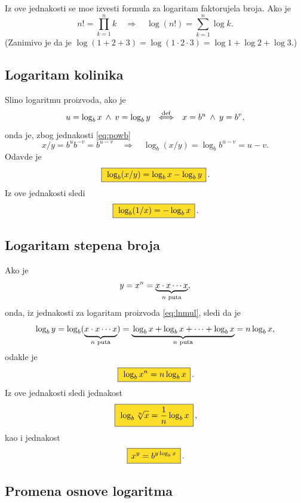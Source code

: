 \documentclass[12pt, twoside, a4paper]{article}
\def\land{\mathbin{\>\wedge\>}}
\def\logb{\log_b}
\def\okvir#1{\,\fcolorbox{black}{Goldenrod}{$\,\displaystyle{\mathstrut #1}\,$}\,}
\def\sledi{{\quad\Rightarrow\quad}}
\def\podef{{\quad\buildrel\rm def\over\Longleftrightarrow\quad}}
\begin{document}
Iz ove jednakosti se mo{\zv}e izvesti formula za logaritam faktorujela broja. Ako je
$$
n!=\prod_{k=1}^n k\sledi \log(n!)=\sum_{k=1}^n\log k.
$$
(Zanim{\lj}ivo je da je $\log(1+2+3)=\log(1\cdot2\cdot3)=\log1+\log2+\log3$.)


\subsection{Logaritam koli{\cv}nika}

Sli{\cv}no logaritmu proizvoda, 
ako je
$$
u=\logb x\land v=\log_b y \podef x=b^u\land y=b^v,
$$
onda je, zbog jednakosti \eqref{eq:powb}
$$
x/ y=b^ub^{-v}=b^{u-v}\sledi \logb(x/y)=\logb b^{u-v}=u-v.
$$
Odavde je
\begin{equation}
\okvir{\logb(x/ y)=\logb x-\logb y}.
\label{eq:lndiv}
\end{equation}
Iz ove jednakosti sledi
\begin{equation}
\okvir{\logb(1/x)=-\logb x}.
\label{eq:recip}
\end{equation}

\subsection{Logaritam stepena broja}

Ako je
$$
y=x^n=\underbrace{x\cdot x\cdots x}_{\text{$\mathstrut n$ puta}},
$$
onda, iz jednakosti za logaritam proizvoda \eqref{eq:lnmul}, sledi da je
$$
\logb y=\logb (\underbrace{\mathstrut x\cdot x\cdots x}_{\text{$n$ puta}})
=\underbrace{\mathstrut \logb x+\logb x+\cdots+\logb x}_{\text{$n$ puta}}
=n\logb x,
$$
odakle je
\begin{equation}
\okvir{\logb x^n=n\logb x}.
\label{eq:bpow}
\end{equation}
Iz ove jednakosti sledi jednakost
\begin{equation}
\okvir{\logb\sqrt[n] x=\frac1n\logb x},
\label{eq:lnroot}
\end{equation}
kao i jednakost
\begin{equation}
\okvir{x^y=b^{y\logb x}}.
\label{eq:power}
\end{equation}


\subsection{Promena osnove logaritma}
\end{document}
